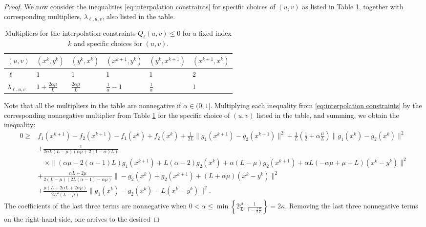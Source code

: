 \documentclass{article} %
\renewcommand{\leq}{\leqslant}
\renewcommand{\geq}{\geqslant}
\begin{document}
\begin{proof}
We now consider the inequalities \eqref{eq:interpolation constraints} for specific choices of $(u,v)$ as listed in Table \ref{tab:1},
together with corresponding multipliers, $\lambda_{\ell,u,v}$, also listed in the table.
{\renewcommand{\arraystretch}{1.3}\begin{table}[h!]
\begin{center}
\begin{tabular}{@{}llllll@{}}
\toprule
  $(u,v)$    & $(x^k,y^k)$& $(y^k,x^k)$ & $(x^{k+1},y^k)$& $(y^k,x^{k+1})$& $(x^{k+1},x^k)$\\  \midrule
  $\ell$     &  $1$ & $1$ & $1$ & $1$ & $2$ \\
  $\lambda_{\ell,u,v}$ & $1 + \frac{2\alpha \mu}{L}$ & $\frac{2\alpha \mu}{L} $ & $\frac{1}{\alpha} - 1$  & $\frac{1}{\alpha}$ & $1$\\
  \bottomrule
\end{tabular}
\end{center}
\caption{\label{tab:1} Multipliers for the interpolation constraints $Q_\ell(u,v) \le 0$ for a fixed index $k$ and specific choices for $(u,v)$.}
\end{table}}
Note that all the multipliers in the table are nonnegative if $\alpha \in (0,1]$.
Multiplying each inequality from \eqref{eq:interpolation constraints} by the corresponding nonnegative multiplier from Table \ref{tab:1} for the specific choice
of $(u,v)$ listed in the table, and summing, we obtain the inequality:
\begin{equation*}
    \begin{aligned}
        0\geq & f_1(x^{k+1})-f_2(x^{k+1})-f_1(x^k)+f_2(x^k)+\tfrac1{2L} \|g_1(x^{k+1})-g_2(x^{k+1})\|^2+\tfrac1L \left(\frac12+\alpha\frac\mu L\right)\|g_1(x^k)-g_2(x^k)\|^2\\
        &+\tfrac{1}{2 \alpha  L (L-\mu ) (\alpha  \mu +2 (1-\alpha ) L)} \\
        &\quad\times\| (\alpha  \mu -2 (\alpha -1) L)g_1(x^{k+1})+L(\alpha-2)g_2(x^k)+\alpha(L-\mu)g_2(x^{k+1})+\alpha  L (-\alpha  \mu +\mu +L)(x^k-y^k)\|^2\\
        &+\tfrac{\alpha L-2\mu}{2(L-\mu)(2L(\alpha-1)-\alpha \mu)}\|-g_2(x^k)+g_2(x^{k+1})+(L+\alpha \mu)(x^k-y^k)\|^2\\
        &+\tfrac{\mu(L+2\alpha L+2\alpha \mu)}{2L^2(L-\mu)}\|g_1(x^k)-g_2(x^k)-L(x^k-y^k)\|^2.
    \end{aligned}
\end{equation*}
The coefficients of the last three terms are nonnegative when $0<\alpha \leq \min \left\{2\frac{\mu}{L}, \frac1{1-\frac{1}{2}\frac{\mu}{L}}\right\}=2\kappa$. Removing the last three nonnegative terms on the right-hand-side, one arrives to the desired

\end{proof}
\end{document}
